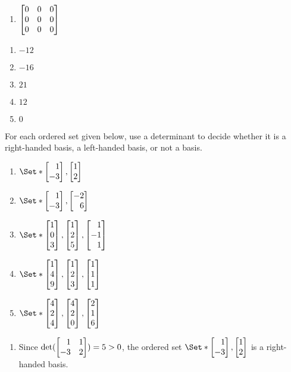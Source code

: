 \begin{exercises}
\begin{problist}
\begin{enumerate}
			\item $\mat{0 & 0 & 0 \\ 0 & 0 & 0 \\ 0 & 0 & 0}$
		\end{enumerate}
		\begin{solution}
			\begin{enumerate}
				\item $-12$

				\item $-16$

				\item $21$

				\item $12$

				\item $0$
			\end{enumerate}
		\end{solution}

		\prob For each ordered set given below, use a determinant to decide whether
		it is a right-handed basis, a left-handed basis, or not a basis.
		\begin{enumerate}
			\item $\Set*{\mat{1 \\ -3},\mat{1 \\ 2}}$

			\item $\Set*{\mat{1 \\ -3},\mat{-2 \\ 6}}$

			\item $\Set*{\mat{1 \\ 0 \\ 3},\mat{1 \\ 2 \\ 5},\mat{1 \\ -1 \\ 1}}$

			\item $\Set*{\mat{1 \\ 4 \\ 9},\mat{1 \\ 2 \\ 3},\mat{1 \\ 1 \\ 1}}$

			\item $\Set*{\mat{4 \\ 2 \\ 4},\mat{4 \\ 2 \\ 0},\mat{2 \\ 1 \\ 6}}$
		\end{enumerate}
		\begin{solution}
			\begin{enumerate}
				\item Since $\det(\mat{1 & 1 \\ -3 & 2})=5>0$, the ordered set
					$\Set*{\mat{1 \\ -3},\mat{1 \\ 2}}$ is a right-handed basis.


\end{enumerate}
\end{solution}
\end{problist}
\end{exercises}
